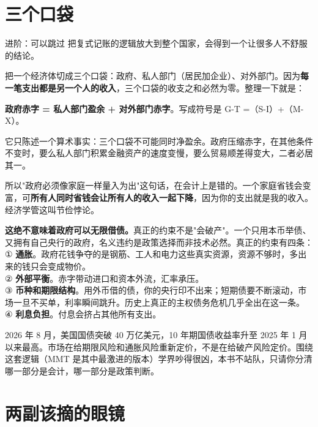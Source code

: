 \section{三个口袋}

\begin{deepbox}{进阶：可以跳过}
把复式记账的逻辑放大到整个国家，会得到一个让很多人不舒服的结论。

把一个经济体切成三个口袋：政府、私人部门（居民加企业）、对外部门。因为\textbf{每一笔支出都是另一个人的收入}，三个口袋的收支之和必然为零。整理一下就是：

\textbf{政府赤字 = 私人部门盈余 + 对外部门赤字}。写成符号是 G-T =（S-I）+（M-X）。

它只陈述一个算术事实：三个口袋不可能同时净盈余。政府压缩赤字，在其他条件不变时，要么私人部门积累金融资产的速度变慢，要么贸易顺差得变大，二者必居其一。

所以"政府必须像家庭一样量入为出"这句话，在会计上是错的。一个家庭省钱会变富，可\textbf{所有人同时省钱会让所有人的收入一起下降}，因为你的支出就是我的收入。经济学管这叫节俭悖论。

\textbf{这绝不意味着政府可以无限借债。}真正的约束不是"会破产"。一个只用本币举债、又拥有自己央行的政府，名义违约是政策选择而非技术必然。真正的约束有四条：\\ ① \textbf{通胀}。政府花钱争夺的是钢筋、工人和电力这些真实资源，资源不够时，多出来的钱只会变成物价。\\ ② \textbf{外部平衡}。赤字带动进口和资本外流，汇率承压。\\ ③ \textbf{币种和期限结构}。用外币借的债，你的央行印不出来；短期债要不断滚动，市场一旦不买单，利率瞬间跳升。历史上真正的主权债务危机几乎全出在这一条。\\ ④ \textbf{利息负担}。付息会挤占其他所有支出。

2026 年 8 月，美国国债突破 40 万亿美元，10 年期国债收益率升至 2025 年 1 月以来最高。市场在给期限风险和通胀风险重新定价，不是在给破产风险定价。围绕这套逻辑（MMT 是其中最激进的版本）学界吵得很凶，本书不站队，只请你分清哪一部分是会计，哪一部分是政策判断。

\end{deepbox}

\section{两副该摘的眼镜}

